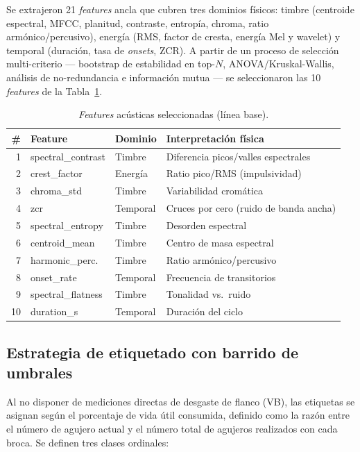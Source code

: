 \documentclass[10pt,twocolumn]{article}
\begin{document}
Se extrajeron 21 \textit{features} ancla que cubren tres dominios
físicos: timbre (centroide espectral, MFCC, planitud, contraste, entropía,
chroma, ratio armónico/percusivo), energía (RMS, factor de cresta, energía
Mel y wavelet) y temporal (duración, tasa de \textit{onsets}, ZCR). A
partir de un proceso de selección multi-criterio --- bootstrap de
estabilidad en top-$N$, ANOVA/Kruskal-Wallis, análisis de no-redundancia
e información mutua --- se seleccionaron las 10 \textit{features} de la
Tabla~\ref{tab:features}.

\begin{table}[htbp]
\centering
\caption{\textit{Features} acústicas seleccionadas (línea base).}
\label{tab:features}
\footnotesize
\begin{tabular}{@{}rlll@{}}
\toprule
\# & Feature & Dominio & Interpretación física \\
\midrule
1 & spectral\_contrast & Timbre & Diferencia picos/valles espectrales \\
2 & crest\_factor      & Energía & Ratio pico/RMS (impulsividad) \\
3 & chroma\_std        & Timbre & Variabilidad cromática \\
4 & zcr                & Temporal & Cruces por cero (ruido de banda ancha) \\
5 & spectral\_entropy  & Timbre & Desorden espectral \\
6 & centroid\_mean     & Timbre & Centro de masa espectral \\
7 & harmonic\_perc.    & Timbre & Ratio armónico/percusivo \\
8 & onset\_rate        & Temporal & Frecuencia de transitorios \\
9 & spectral\_flatness & Timbre & Tonalidad vs.\ ruido \\
10 & duration\_s       & Temporal & Duración del ciclo \\
\bottomrule
\end{tabular}
\end{table}

\subsection{Estrategia de etiquetado con barrido de umbrales}
\label{sec:etiquetado}

Al no disponer de mediciones directas de desgaste de flanco (VB), las
etiquetas se asignan según el porcentaje de vida útil consumida, definido
como la razón entre el número de agujero actual y el número total de
agujeros realizados con cada broca. Se definen tres clases ordinales:
\end{document}
